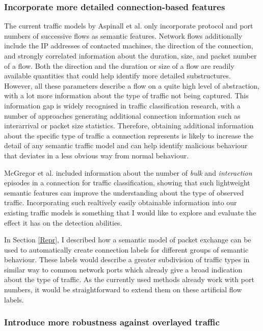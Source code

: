 \documentclass[a4paper,12pt,twoside]{report}
\begin{document}
\subsubsection{Incorporate more detailed connection-based features}


The current traffic models by Aspinall et al. only incorporate protocol and port numbers of successive flows as semantic features. Network flows additionally include the IP addresses of contacted machines, the direction of the connection, and strongly correlated information about the duration, size, and packet number of a flow. Both the direction and the duration or size of a flow are readily available quantities that could help identify more detailed substructures. However, all these parameters describe a flow on a quite high level of abstraction, with a lot more information about the type of traffic not being captured. This information gap is widely recognised in traffic classification research, with a number of approaches generating additional connection information such as interarrival or packet size statistics. Therefore, obtaining additional information about the specific type of traffic a connection represents is likely to increase the detail of any semantic traffic model and can help identify malicious behaviour that deviates in a less obvious way from normal behaviour.

McGregor et al. \cite{mcgregor2004flow} included information about the number of \textit{bulk} and \textit{interaction} episodes in a connection for traffic classification, showing that such lightweight semantic features can improve the understanding about the type of observed traffic. Incorporating such realtively easily obtainable information into our existing traffic models is something that I would like to explore and evaluate the effect it has on the detection abilities. 

In Section \ref{Repr}, I described how a semantic model of packet exchange can be used to automatically create connection labels for different groups of semantic behaviour. These labels would describe a greater subdivision of traffic types in similar way to common network ports which already give a broad indication about the type of traffic. As the currently used methods already work with port numbers, it would be straightforward to extend them on these artificial flow labels.


\subsubsection{Introduce more robustness against overlayed traffic}
\end{document}
